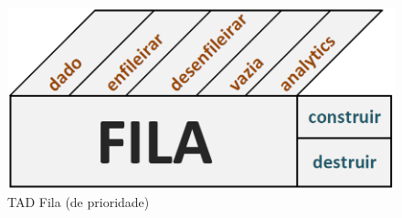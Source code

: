 \begin{figure}[h!]
\centering
\includegraphics[width=.4\textwidth]{TAD_Fila_prioridade.png}
\caption{TAD Fila (de prioridade)}
\label{fig:1}
\end{figure}
